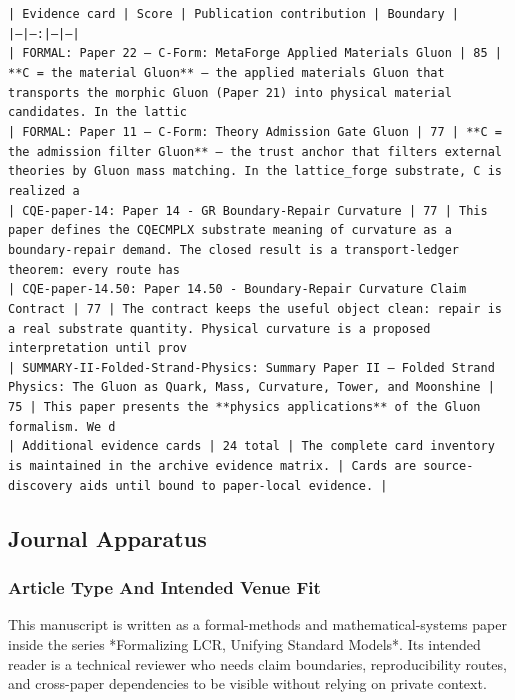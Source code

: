 \documentclass[11pt]{article}
\begin{document}
\noindent\texttt{| Evidence card | Score | Publication contribution | Boundary |}\\
\noindent\texttt{|---|---:|---|---|}\\
\noindent\texttt{| FORMAL: Paper 22 — C-Form: MetaForge Applied Materials Gluon | 85 | **C = the material Gluon** — the applied materials Gluon that transports the morphic Gluon (Paper 21) into physical material candidates. In the lattic}\\
\noindent\texttt{| FORMAL: Paper 11 — C-Form: Theory Admission Gate Gluon | 77 | **C = the admission filter Gluon** — the trust anchor that filters external theories by Gluon mass matching. In the lattice\_forge substrate, C is realized a}\\
\noindent\texttt{| CQE-paper-14: Paper 14 - GR Boundary-Repair Curvature | 77 | This paper defines the CQECMPLX substrate meaning of curvature as a boundary-repair demand. The closed result is a transport-ledger theorem: every route has }\\
\noindent\texttt{| CQE-paper-14.50: Paper 14.50 - Boundary-Repair Curvature Claim Contract | 77 | The contract keeps the useful object clean: repair is a real substrate quantity. Physical curvature is a proposed interpretation until prov}\\
\noindent\texttt{| SUMMARY-II-Folded-Strand-Physics: Summary Paper II — Folded Strand Physics: The Gluon as Quark, Mass, Curvature, Tower, and Moonshine | 75 | This paper presents the **physics applications** of the Gluon formalism. We d}\\
\noindent\texttt{| Additional evidence cards | 24 total | The complete card inventory is maintained in the archive evidence matrix. | Cards are source-discovery aids until bound to paper-local evidence. |}\\

\subsection*{Journal Apparatus}

\subsubsection*{Article Type And Intended Venue Fit}

This manuscript is written as a formal-methods and mathematical-systems paper
inside the series *Formalizing LCR, Unifying Standard Models*. Its intended
reader is a technical reviewer who needs claim boundaries, reproducibility
routes, and cross-paper dependencies to be visible without relying on private
context.
\end{document}
